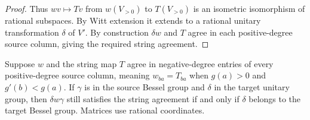 \begin{proof}
Thus $w v\mapsto Tv$ from $w(V_{>0})$ to $T(V_{>0})$ is an isometric isomorphism of rational subspaces. By Witt extension it extends to a rational unitary transformation $\delta$ of $V'$. By construction $\delta w$ and $T$ agree in each positive-degree source column, giving the required string agreement.
\end{proof}

\begin{lemma}
\label{lem:a-bessel-chord-stabilizer}
\emitthmsource
Suppose $w$ and the string map $T$ agree in negative-degree entries of every positive-degree source column, meaning $w_{ba}=T_{ba}$ when $g(a)>0$ and $g'(b)<g(a)$. If $\gamma$ is in the source Bessel group and $\delta$ in the target unitary group, then $\delta w\gamma$ still satisfies the string agreement if and only if $\delta$ belongs to the target Bessel group. Matrices use rational coordinates.
\end{lemma}
